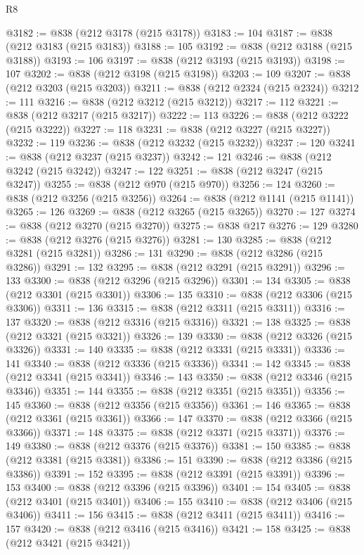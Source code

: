 \begin{lexlean}{R8}
\begin{coremodule}
@3182 := @838 (@212 @3178 (@215 @3178))
@3183 := 104
@3187 := @838 (@212 @3183 (@215 @3183))
@3188 := 105
@3192 := @838 (@212 @3188 (@215 @3188))
@3193 := 106
@3197 := @838 (@212 @3193 (@215 @3193))
@3198 := 107
@3202 := @838 (@212 @3198 (@215 @3198))
@3203 := 109
@3207 := @838 (@212 @3203 (@215 @3203))
@3211 := @838 (@212 @2324 (@215 @2324))
@3212 := 111
@3216 := @838 (@212 @3212 (@215 @3212))
@3217 := 112
@3221 := @838 (@212 @3217 (@215 @3217))
@3222 := 113
@3226 := @838 (@212 @3222 (@215 @3222))
@3227 := 118
@3231 := @838 (@212 @3227 (@215 @3227))
@3232 := 119
@3236 := @838 (@212 @3232 (@215 @3232))
@3237 := 120
@3241 := @838 (@212 @3237 (@215 @3237))
@3242 := 121
@3246 := @838 (@212 @3242 (@215 @3242))
@3247 := 122
@3251 := @838 (@212 @3247 (@215 @3247))
@3255 := @838 (@212 @970 (@215 @970))
@3256 := 124
@3260 := @838 (@212 @3256 (@215 @3256))
@3264 := @838 (@212 @1141 (@215 @1141))
@3265 := 126
@3269 := @838 (@212 @3265 (@215 @3265))
@3270 := 127
@3274 := @838 (@212 @3270 (@215 @3270))
@3275 := @838 @217
@3276 := 129
@3280 := @838 (@212 @3276 (@215 @3276))
@3281 := 130
@3285 := @838 (@212 @3281 (@215 @3281))
@3286 := 131
@3290 := @838 (@212 @3286 (@215 @3286))
@3291 := 132
@3295 := @838 (@212 @3291 (@215 @3291))
@3296 := 133
@3300 := @838 (@212 @3296 (@215 @3296))
@3301 := 134
@3305 := @838 (@212 @3301 (@215 @3301))
@3306 := 135
@3310 := @838 (@212 @3306 (@215 @3306))
@3311 := 136
@3315 := @838 (@212 @3311 (@215 @3311))
@3316 := 137
@3320 := @838 (@212 @3316 (@215 @3316))
@3321 := 138
@3325 := @838 (@212 @3321 (@215 @3321))
@3326 := 139
@3330 := @838 (@212 @3326 (@215 @3326))
@3331 := 140
@3335 := @838 (@212 @3331 (@215 @3331))
@3336 := 141
@3340 := @838 (@212 @3336 (@215 @3336))
@3341 := 142
@3345 := @838 (@212 @3341 (@215 @3341))
@3346 := 143
@3350 := @838 (@212 @3346 (@215 @3346))
@3351 := 144
@3355 := @838 (@212 @3351 (@215 @3351))
@3356 := 145
@3360 := @838 (@212 @3356 (@215 @3356))
@3361 := 146
@3365 := @838 (@212 @3361 (@215 @3361))
@3366 := 147
@3370 := @838 (@212 @3366 (@215 @3366))
@3371 := 148
@3375 := @838 (@212 @3371 (@215 @3371))
@3376 := 149
@3380 := @838 (@212 @3376 (@215 @3376))
@3381 := 150
@3385 := @838 (@212 @3381 (@215 @3381))
@3386 := 151
@3390 := @838 (@212 @3386 (@215 @3386))
@3391 := 152
@3395 := @838 (@212 @3391 (@215 @3391))
@3396 := 153
@3400 := @838 (@212 @3396 (@215 @3396))
@3401 := 154
@3405 := @838 (@212 @3401 (@215 @3401))
@3406 := 155
@3410 := @838 (@212 @3406 (@215 @3406))
@3411 := 156
@3415 := @838 (@212 @3411 (@215 @3411))
@3416 := 157
@3420 := @838 (@212 @3416 (@215 @3416))
@3421 := 158
@3425 := @838 (@212 @3421 (@215 @3421))

\end{coremodule}
\end{lexlean}
